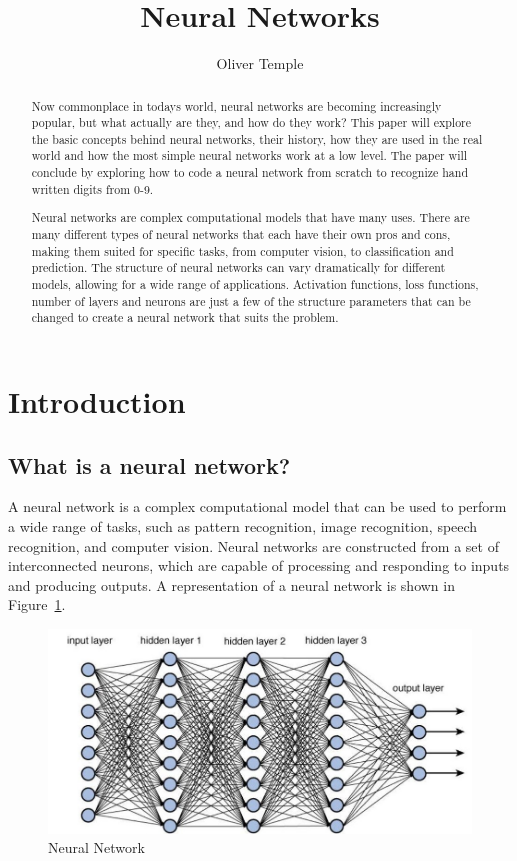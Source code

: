 \documentclass[titlepage]{article}
\title{Neural Networks}
\author{Oliver Temple}
\begin{document}
\maketitle

\begin{abstract}
    Now commonplace in todays world, neural networks are becoming increasingly popular, but what actually are they, and how do they work? This paper will explore the basic concepts behind neural networks, their history, how they are used in the real world and how the most simple neural networks work at a low level. The paper will conclude by exploring how to code a neural network from scratch to recognize hand written digits from 0-9.

    Neural networks are complex computational models that have many uses. There are many different types of neural networks that each have their own pros and cons, making them suited for specific tasks, from computer vision, to classification and prediction. The structure of neural networks can vary dramatically for different models, allowing for a wide range of applications. Activation functions, loss functions, number of layers and neurons are just a few of the structure parameters that can be changed to create a neural network that suits the problem.
\end{abstract}
\tableofcontents
\newpage
\section{Introduction}
\subsection{What is a neural network?}
A neural network is a complex computational model that can be used to perform a wide range of tasks, such as pattern recognition, image recognition, speech recognition, and computer vision. Neural networks are constructed from a set of interconnected neurons, which are capable of processing and responding to inputs and producing outputs. A representation of a neural network is shown in Figure~\ref{fig:neural_network}.

\begin{figure}[h!]
    \includegraphics[width=\textwidth]{./assets/neural_network.jpeg}
    \caption{Neural Network}
    \label{fig:neural_network}
\end{figure}
\end{document}
